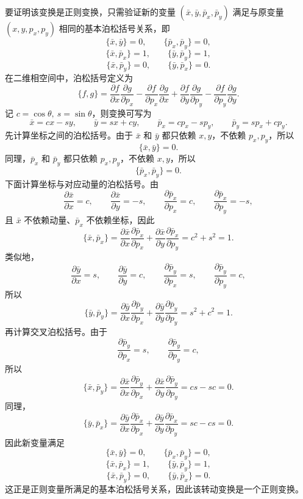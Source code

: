 \begin{solution}[正则变换例子]
\answer
要证明该变换是正则变换，只需验证新的变量 \((\bar{x},\bar{y},\bar{p}_x,\bar{p}_y)\) 满足与原变量 \((x,y,p_x,p_y)\) 相同的基本泊松括号关系，即
\[
\{\bar{x},\bar{y}\}=0,\qquad \{\bar{p}_x,\bar{p}_y\}=0,
\]
\[
\{\bar{x},\bar{p}_x\}=1,\qquad \{\bar{y},\bar{p}_y\}=1,
\]
\[
\{\bar{x},\bar{p}_y\}=0,\qquad \{\bar{y},\bar{p}_x\}=0.
\]
在二维相空间中，泊松括号定义为
\[
\{f,g\}
=
\frac{\partial f}{\partial x}\frac{\partial g}{\partial p_x}
-\frac{\partial f}{\partial p_x}\frac{\partial g}{\partial x}
+
\frac{\partial f}{\partial y}\frac{\partial g}{\partial p_y}
-\frac{\partial f}{\partial p_y}\frac{\partial g}{\partial y}.
\]
记 \(c=\cos\theta,\ s=\sin\theta\)，则变换可写为
\[
\bar{x}=cx-sy,\qquad \bar{y}=sx+cy,\qquad
\bar{p}_x=cp_x-sp_y,\qquad \bar{p}_y=sp_x+cp_y.
\]
先计算坐标之间的泊松括号。由于 \(\bar{x}\) 和 \(\bar{y}\) 都只依赖 \(x,y\)，不依赖 \(p_x,p_y\)，所以
\[
\{\bar{x},\bar{y}\}=0.
\]
同理，\(\bar{p}_x\) 和 \(\bar{p}_y\) 都只依赖 \(p_x,p_y\)，不依赖 \(x,y\)，所以
\[
\{\bar{p}_x,\bar{p}_y\}=0.
\]
下面计算坐标与对应动量的泊松括号。由
\[
\frac{\partial\bar{x}}{\partial x}=c,\qquad
\frac{\partial\bar{x}}{\partial y}=-s,\qquad
\frac{\partial\bar{p}_x}{\partial p_x}=c,\qquad
\frac{\partial\bar{p}_x}{\partial p_y}=-s,
\]
且 \(\bar{x}\) 不依赖动量、\(\bar{p}_x\) 不依赖坐标，因此
\[
\{\bar{x},\bar{p}_x\}
=
\frac{\partial\bar{x}}{\partial x}\frac{\partial\bar{p}_x}{\partial p_x}
+
\frac{\partial\bar{x}}{\partial y}\frac{\partial\bar{p}_x}{\partial p_y}
=
c^2+s^2=1.
\]
类似地，
\[
\frac{\partial\bar{y}}{\partial x}=s,\qquad
\frac{\partial\bar{y}}{\partial y}=c,\qquad
\frac{\partial\bar{p}_y}{\partial p_x}=s,\qquad
\frac{\partial\bar{p}_y}{\partial p_y}=c,
\]
所以
\[
\{\bar{y},\bar{p}_y\}
=
\frac{\partial\bar{y}}{\partial x}\frac{\partial\bar{p}_y}{\partial p_x}
+
\frac{\partial\bar{y}}{\partial y}\frac{\partial\bar{p}_y}{\partial p_y}
=
s^2+c^2=1.
\]
再计算交叉泊松括号。由于
\[
\frac{\partial\bar{p}_y}{\partial p_x}=s,\qquad
\frac{\partial\bar{p}_y}{\partial p_y}=c,
\]
所以
\[
\{\bar{x},\bar{p}_y\}
=
\frac{\partial\bar{x}}{\partial x}\frac{\partial\bar{p}_y}{\partial p_x}
+
\frac{\partial\bar{x}}{\partial y}\frac{\partial\bar{p}_y}{\partial p_y}
=
cs-sc=0.
\]
同理，
\[
\{\bar{y},\bar{p}_x\}
=
\frac{\partial\bar{y}}{\partial x}\frac{\partial\bar{p}_x}{\partial p_x}
+
\frac{\partial\bar{y}}{\partial y}\frac{\partial\bar{p}_x}{\partial p_y}
=
sc-cs=0.
\]
因此新变量满足
\[
\{\bar{x},\bar{y}\}=0,\qquad
\{\bar{p}_x,\bar{p}_y\}=0,
\]
\[
\{\bar{x},\bar{p}_x\}=1,\qquad
\{\bar{y},\bar{p}_y\}=1,
\]
\[
\{\bar{x},\bar{p}_y\}=0,\qquad
\{\bar{y},\bar{p}_x\}=0.
\]
这正是正则变量所满足的基本泊松括号关系，因此该转动变换是一个正则变换。
\end{solution}


